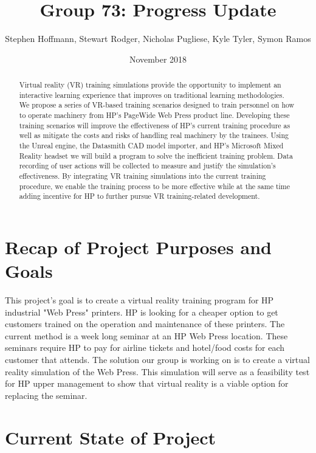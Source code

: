 \documentclass[onecolumn, draftclsnofoot,10pt, compsoc]{IEEEtran}
\title{Group 73: Progress Update}
\author{Stephen Hoffmann, Stewart Rodger, Nicholas Pugliese, Kyle Tyler, Symon Ramos}
\date{November 2018}
\begin{document}
\maketitle
    \begin{abstract}
   Virtual reality (VR) training simulations provide the opportunity to implement an interactive learning experience that improves on traditional learning methodologies. We propose a series of VR-based training scenarios designed to train personnel on how to operate machinery from HP’s PageWide Web Press product line. Developing these training scenarios will improve the effectiveness of HP’s current training procedure as well as mitigate the costs and risks of handling real machinery by the trainees. Using the Unreal engine, the Datasmith CAD model importer, and HP's Microsoft Mixed Reality headset we will build a program to solve the inefficient training problem. Data recording of user actions will be collected to measure and justify the simulation’s effectiveness. By integrating VR training simulations into the current training procedure, we enable the training process to be more effective while at the same time adding incentive for HP to further pursue VR training-related development.
    \end{abstract}
\newpage
{}
\tableofcontents
\clearpage

\section{Recap of Project Purposes and Goals}

This project's goal is to create a virtual reality training program for HP industrial "Web Press" printers. HP is looking for a cheaper option to get customers trained on the operation and maintenance of these printers. The current method is a week long seminar at an HP Web Press location. These seminars require HP to pay for airline tickets and hotel/food costs for each customer that attends. The solution our group is working on is to create a virtual reality simulation of the Web Press. This simulation will serve as a feasibility test for HP upper management to show that virtual reality is a viable option for replacing the seminar.

\section{Current State of Project}
\end{document}
